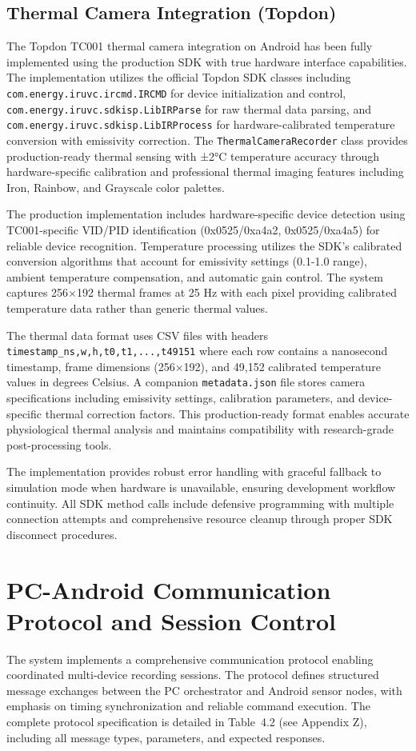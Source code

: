 \subsection{Thermal Camera Integration (Topdon)}\label{sec:4-2-1}
The Topdon TC001 thermal camera integration on Android has been fully implemented using the production SDK with true hardware interface capabilities. The implementation utilizes the official Topdon SDK classes including \texttt{com.energy.iruvc.ircmd.IRCMD} for device initialization and control, \texttt{com.energy.iruvc.sdkisp.LibIRParse} for raw thermal data parsing, and \texttt{com.energy.iruvc.sdkisp.LibIRProcess} for hardware-calibrated temperature conversion with emissivity correction. The \texttt{ThermalCameraRecorder} class provides production-ready thermal sensing with ±2°C temperature accuracy through hardware-specific calibration and professional thermal imaging features including Iron, Rainbow, and Grayscale color palettes.

The production implementation includes hardware-specific device detection using TC001-specific VID/PID identification (0x0525/0xa4a2, 0x0525/0xa4a5) for reliable device recognition. Temperature processing utilizes the SDK's calibrated conversion algorithms that account for emissivity settings (0.1-1.0 range), ambient temperature compensation, and automatic gain control. The system captures 256×192 thermal frames at 25 Hz with each pixel providing calibrated temperature data rather than generic thermal values.

The thermal data format uses CSV files with headers \texttt{timestamp\_ns,w,h,t0,t1,...,t49151} where each row contains a nanosecond timestamp, frame dimensions (256×192), and 49{,}152 calibrated temperature values in degrees Celsius. A companion \texttt{metadata.json} file stores camera specifications including emissivity settings, calibration parameters, and device-specific thermal correction factors. This production-ready format enables accurate physiological thermal analysis and maintains compatibility with research-grade post-processing tools.

The implementation provides robust error handling with graceful fallback to simulation mode when hardware is unavailable, ensuring development workflow continuity. All SDK method calls include defensive programming with multiple connection attempts and comprehensive resource cleanup through proper SDK disconnect procedures.

\section{PC-Android Communication Protocol and Session Control}\label{sec:4-4}
The system implements a comprehensive communication protocol enabling coordinated multi-device recording sessions. The protocol defines structured message exchanges between the PC orchestrator and Android sensor nodes, with emphasis on timing synchronization and reliable command execution. The complete protocol specification is detailed in Table~4.2 (see Appendix Z), including all message types, parameters, and expected responses.

